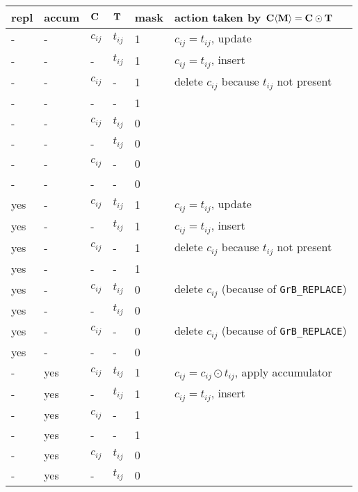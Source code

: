 \documentclass[12pt]{article}
\begin{document}
{\begin{table}
{\small
\begin{tabular}{lllll|l}
\hline
repl & accum & ${\bf C}$ & ${\bf T}$ & mask & action taken by ${\bf C \langle M \rangle = C \odot T}$ \\
\hline
    -  &-   & $c_{ij}$ & $t_{ij}$  & 1    &  $c_{ij} = t_{ij}$, update \\
    -  &-   &  -       & $t_{ij}$  & 1    &  $c_{ij} = t_{ij}$, insert \\
    -  &-   & $c_{ij}$ &  -        & 1    &  delete $c_{ij}$ because $t_{ij}$ not present \\
    -  &-   &  -       &  -        & 1    &   \\
    -  &-   & $c_{ij}$ & $t_{ij}$  & 0    &   \\
    -  &-   &  -       & $t_{ij}$  & 0    &   \\
    -  &-   & $c_{ij}$ &  -        & 0    &   \\
    -  &-   &  -       &  -        & 0    &   \\
\hline
    yes&-   & $c_{ij}$ & $t_{ij}$  & 1    &  $c_{ij} = t_{ij}$, update \\
    yes&-   &  -       & $t_{ij}$  & 1    &  $c_{ij} = t_{ij}$, insert \\
    yes&-   & $c_{ij}$ &  -        & 1    &  delete $c_{ij}$ because $t_{ij}$ not present \\
    yes&-   &  -       &  -        & 1    &   \\
    yes&-   & $c_{ij}$ & $t_{ij}$  & 0    &  delete $c_{ij}$  (because of \verb'GrB_REPLACE') \\
    yes&-   &  -       & $t_{ij}$  & 0    &   \\
    yes&-   & $c_{ij}$ &  -        & 0    &  delete $c_{ij}$  (because of \verb'GrB_REPLACE') \\
    yes&-   &  -       &  -        & 0    &   \\
\hline
    -  &yes & $c_{ij}$ & $t_{ij}$  & 1    &  $c_{ij} = c_{ij} \odot t_{ij}$, apply accumulator \\
    -  &yes &  -       & $t_{ij}$  & 1    &  $c_{ij} = t_{ij}$, insert \\
    -  &yes & $c_{ij}$ &  -        & 1    &   \\
    -  &yes &  -       &  -        & 1    &   \\
    -  &yes & $c_{ij}$ & $t_{ij}$  & 0    &   \\
    -  &yes &  -       & $t_{ij}$  & 0    &   \\

\end{tabular}}
\end{table}}
\end{document}
